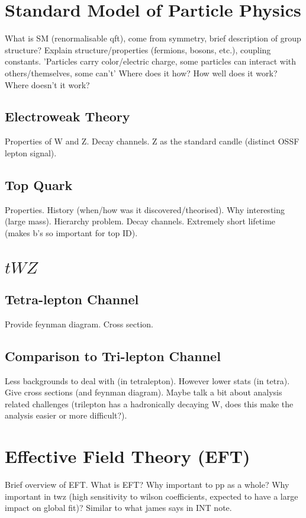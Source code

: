 \section{Standard Model of Particle Physics}
What is SM (renormalisable qft), come from symmetry, brief description of group structure? Explain structure/properties (fermions, bosons, etc.), coupling constants. 'Particles carry color/electric charge, some particles can interact with others/themselves, some can't' Where does it how? How well does it work? Where doesn't it work? 
\subsection{Electroweak Theory}
Properties of W and Z. Decay channels. Z as the standard candle (distinct OSSF lepton signal).
\subsection{Top Quark}
Properties. History (when/how was it discovered/theorised). Why interesting (large mass). Hierarchy problem. Decay channels. Extremely short lifetime (makes b's so important for top ID).
\section{$tWZ$}
\subsection{Tetra-lepton Channel}
Provide feynman diagram. Cross section. 

\subsection{Comparison to Tri-lepton Channel}

Less backgrounds to deal with (in tetralepton). However lower stats (in tetra). Give cross sections (and feynman diagram). Maybe talk a bit about analysis related challenges (trilepton has a hadronically decaying W, does this make the analysis easier or more difficult?).

\section{Effective Field Theory (EFT)}
Brief overview of EFT. What is EFT? Why important to pp as a whole? Why important in twz (high sensitivity to wilson coefficients, expected to have a large impact on global fit)? Similar to what james says in INT note.
